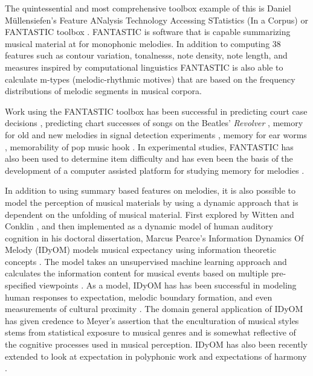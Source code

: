\documentclass[12pt,]{book}
\begin{document}
The quintessential and most comprehensive toolbox example of this is Daniel Müllensiefen's Feature ANalysis Technology Accessing STatistics (In a Corpus) or FANTASTIC toolbox \citep{mullensiefenFantasticFeatureANalysis2009}.
FANTASTIC is software that is capable summarizing musical material at for monophonic melodies.
In addition to computing 38 features such as contour variation, tonalnesss, note density, note length, and measures inspired by computational linguistics \citep{manningFoundationsStatisticalNatural1999} FANTASTIC is also able to calculate m-types (melodic-rhythmic motives) that are based on the frequency distributions of melodic segments in musical corpora.

Work using the FANTASTIC toolbox has been successful in predicting court case decisions \citep{mullensiefenCourtDecisionsMusic2009}, predicting chart successes of songs on the Beatles' \emph{Revolver} \citep{kopiezAufSucheNach2011}, memory for old and new melodies in signal detection experiments \citep{mullensiefenRoleFeaturesContext2014}, memory for ear worms \citep{jakubowskiDissectingEarwormMelodic2017, williamsonEarwormsThreeAngles2012}, memorability of pop music hook \citep{balenCorpusAnalyisTools2015}.
In experimental studies, FANTASTIC has also been used to determine item difficulty \citep{bakerPerceptionLeitmotivesRichard2017, harrisonModellingMelodicDiscrimination2016} and has even been the basis of the development of a computer assisted platform for studying memory for melodies \citep{rainsfordMUSOSMUsicSOftware2018}.

In addition to using summary based features on melodies, it is also possible to model the perception of musical materials by using a dynamic approach that is dependent on the unfolding of musical material.
First explored by Witten and Conklin \citep{conklinMultipleViewpointSystems1995}, and then implemented as a dynamic model of human auditory cognition in his doctoral dissertation, Marcus Pearce's Information Dynamics Of Melody (IDyOM) models musical expectancy using information theoretic concepts \citep{shannonMathematicalTheoryCommunication1948}.
The model takes an unsupervised machine learning approach and calculates the information content for musical events based on multiple pre-specified viewpoints \citep{pearceConstructionEvaluationStatistical2005}.
As a model, IDyOM has has been successful in modeling human responses to expectation, melodic boundary formation, and even measurements of cultural proximity \citep{pearceAuditoryExpectationInformation2012, pearceStatisticalLearningProbabilistic2018a}.
The domain general application of IDyOM has given credence to Meyer's assertion that the enculturation of musical styles stems from statistical exposure to musical genres and is somewhat reflective of the cognitive processes used in musical perception.
IDyOM has also been recently extended to look at expectation in polyphonic work \citep{sauvePredictionPolyphonyModelling2017} and expectations of harmony \citep{harrisonDissociatingSensoryCognitive2018}.
\end{document}
